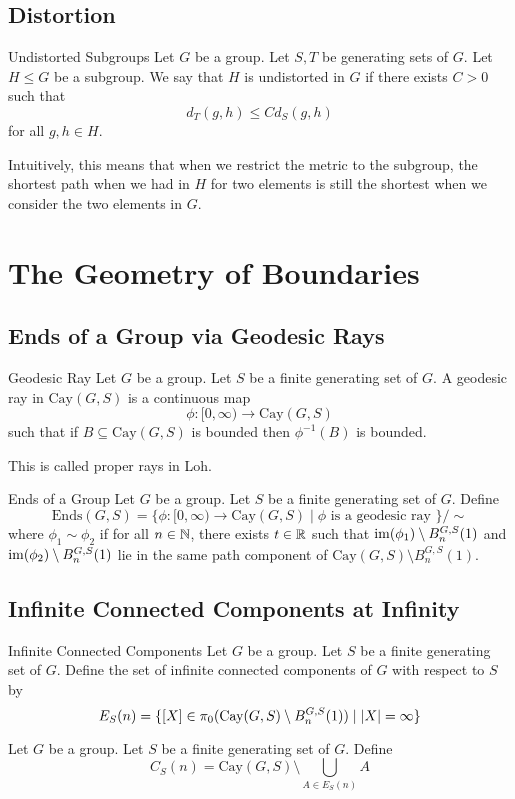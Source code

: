 \documentclass[a4paper]{article}
\begin{document}
\subsection{Distortion}
\begin{defn}{Undistorted Subgroups}{} Let $G$ be a group. Let $S,T$ be generating sets of $G$. Let $H\leq G$ be a subgroup. We say that $H$ is undistorted in $G$ if there exists $C>0$ such that $$d_T(g,h)\leq C d_S(g,h)$$ for all $g,h\in H$. 
\end{defn}

Intuitively, this means that when we restrict the metric to the subgroup, the shortest path when we had in $H$ for two elements is still the shortest when we consider the two elements in $G$. 

\pagebreak
\section{The Geometry of Boundaries}
\subsection{Ends of a Group via Geodesic Rays}
\begin{defn}{Geodesic Ray}{} Let $G$ be a group. Let $S$ be a finite generating set of $G$. A geodesic ray in $\text{Cay}(G,S)$ is a continuous map $$\phi:[0,\infty)\to\text{Cay}(G,S)$$ such that if $B\subseteq\text{Cay}(G,S)$ is bounded then $\phi^{-1}(B)$ is bounded. 
\end{defn}

This is called proper rays in Loh. 

\begin{defn}{Ends of a Group}{} Let $G$ be a group. Let $S$ be a finite generating set of $G$. Define $$\text{Ends}(G,S)=\{\phi:[0,\infty)\to\text{Cay}(G,S)\;|\;\phi\text{ is a geodesic ray }\}/\sim$$ where $\phi_1\sim\phi_2$ if for all $n\in\mathbb{N}$, there exists $t\in\mathbb{R}$ such that $\operatorname{im}(\phi_1)\setminus B_n^{G,S}(1)$ and $\operatorname{im}(\phi_2)\setminus B_n^{G,S}(1)$ lie in the same path component of $\text{Cay}(G,S)\setminus B_n^{G,S}(1)$. 
\end{defn}

\subsection{Infinite Connected Components at Infinity}
\begin{defn}{Infinite Connected Components}{} Let $G$ be a group. Let $S$ be a finite generating set of $G$. Define the set of infinite connected components of $G$ with respect to $S$ by $$E_S(n)=\{[X]\in\pi_0(\text{Cay}(G,S)\setminus B_n^{G,S}(1))\;|\;\abs{X}=\infty\}$$
\end{defn}

\begin{defn}{}{} Let $G$ be a group. Let $S$ be a finite generating set of $G$. Define $$C_S(n)=\text{Cay}(G,S)\setminus\bigcup_{A\in E_S(n)}A$$
\end{defn}
\end{document}
